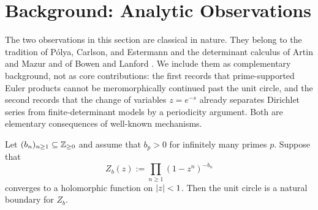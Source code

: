 \section{Background: Analytic Observations}
\label{sec:analytic}

The two observations in this section are classical in nature. They
belong to the tradition of P\'olya, Carlson, and Estermann
\cite{Polya1923,Carlson1921,Estermann1928} and the determinant calculus
of Artin and Mazur and of Bowen and Lanford
\cite{ArtinMazur1965,BowenLanford1970}. We include them as
complementary background, not as core contributions: the first records
that prime-supported Euler products cannot be meromorphically continued
past the unit circle, and the second records that the change of
variables \(z=e^{-s}\) already separates Dirichlet series from
finite-determinant models by a periodicity argument. Both are elementary
consequences of well-known mechanisms.

\begin{theorem}
  \label{thm:euler-product-natural-boundary}
  Let \((b_n)_{n\ge 1}\subseteq\mathbb{Z}_{\ge 0}\) and assume that
  \(b_p>0\) for infinitely many primes \(p\). Suppose that
  \[
    Z_b(z):=\prod_{n\ge 1}(1-z^n)^{-b_n}
  \]
  converges to a holomorphic function on \(\lvert z \rvert<1\). Then the unit
  circle is a natural boundary for \(Z_b\).
\end{theorem}


